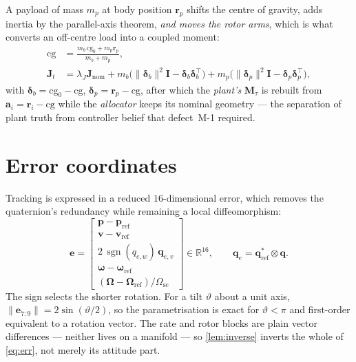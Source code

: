 \documentclass[11pt,a4paper,twoside,openright]{report}
\newcommand{\R}{\mathbb{R}}
\newcommand{\sgn}{\operatorname{sgn}}
\newcommand{\transp}{^{\!\top}}
\renewcommand{\vec}[1]{\bm{#1}}
\newcommand{\mat}[1]{\bm{#1}}
\newcommand{\err}{\vec{e}}
\newcommand{\quat}{\vec{q}}
\newcommand{\bodyrate}{\vec{\omega}}
\newcommand{\refsym}{\mathrm{ref}}
\theoremstyle{plain}
\theoremstyle{definition}
\theoremstyle{remark}
\DeclareRobustCommand{\nbd}{\mbox{-}}
\begin{document}
	A payload of mass $m_p$ at body position $\vec r_p$ shifts the centre of gravity,
	adds inertia by the parallel-axis theorem, \emph{and moves the rotor arms},
	which is what converts an off-centre load into a coupled moment:
	\begin{align}
		\mathrm{cg} &= \frac{m_b\,\mathrm{cg}_0+m_p\vec r_p}{m_b+m_p},
		\label{eq:cg}\\
		\mat J_t &= \lambda_J\mat J_\mathrm{nom}
		+m_b\big(\|\vec\delta_b\|^2\mat I-\vec\delta_b\vec\delta_b\transp\big)
		+m_p\big(\|\vec\delta_p\|^2\mat I-\vec\delta_p\vec\delta_p\transp\big),
		\label{eq:Jpayload}
	\end{align}
	with $\vec\delta_b=\mathrm{cg}_0-\mathrm{cg}$, $\vec\delta_p=\vec r_p-\mathrm{cg}$,
	after which the \emph{plant's} $\mat M_\tau$ is rebuilt from
	$\vec a_i=\vec r_i-\mathrm{cg}$ while the \emph{allocator} keeps its nominal
	geometry --- the separation of plant truth from controller belief that
	defect~M\nbd 1 required.

	\section{Error coordinates}
	\label{sec:error}

	Tracking is expressed in a reduced $16$-dimensional error, which removes the
	quaternion's redundancy while remaining a local diffeomorphism:
	\begin{equation}
		\err=\begin{bmatrix}\vec p-\vec p_\refsym\\ \vec v-\vec v_\refsym\\
			2\,\sgn(q_{e,w})\,\vec q_{e,v}\\
			\bodyrate-\bodyrate_\refsym\\
			(\vec\Omega-\vec\Omega_\refsym)/\Omega_\mathrm{sc}
		\end{bmatrix}\in\R^{16},
		\qquad \quat_e=\quat_\refsym^{*}\otimes\quat.
		\label{eq:err}
	\end{equation}
	The sign selects the shorter rotation. For a tilt $\vartheta$ about a unit axis,
	$\|\err_{7:9}\|=2\sin(\vartheta/2)$, so the parametrisation is exact for
	$\vartheta<\pi$ and first-order equivalent to a rotation vector. The rate and
	rotor blocks are plain vector differences --- neither lives on a manifold ---
	so \cref{lem:inverse} inverts the whole of \cref{eq:err}, not merely its
	attitude part.
\end{document}
